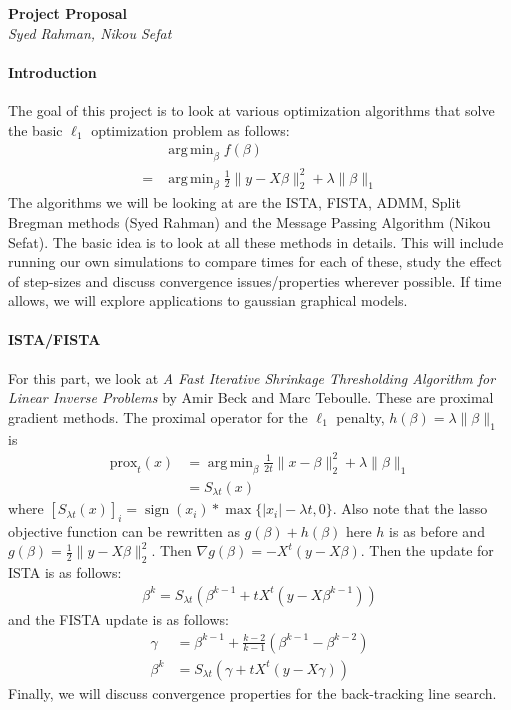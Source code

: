 \documentclass[12pt, leqno]{article}
\providecommand{\abs}[1]{\lvert#1\rvert} %
\providecommand{\norm}[1]{\lVert#1\rVert} %
\DeclareMathOperator*{\argmin}{arg\,min}
\DeclareMathOperator*{\sign}{sign}
\begin{document}
\pagestyle{fancy}

\begin{center}
{\large {\bf Project Proposal}} \\
{{\it Syed Rahman, Nikou Sefat}} \\
\end{center}

\paragraph{Introduction} The goal of this project is to look at various
optimization algorithms that solve the basic $\ell_1$ optimization
problem as follows:
\begin{align}
\label{eq:lasso}
& \argmin_{\beta} f(\beta) \\ 
\nonumber 
=& \argmin_{\beta} \frac{1}{2}\norm{y- X \beta}_2^2 + \lambda \norm{\beta}_1
\end{align}
The algorithms we will be looking at are the ISTA, FISTA, ADMM, Split
Bregman methods (Syed Rahman) and the Message Passing Algorithm (Nikou Sefat). The
basic idea is to look at all these methods in details. This will include running our own simulations to compare times
for each of these, study the effect of step-sizes and discuss
convergence issues/properties wherever possible. If time allows, we
will explore applications to gaussian graphical models. 

\paragraph{ISTA/FISTA} For this part, we look at {\it A Fast
  Iterative Shrinkage Thresholding Algorithm
for Linear Inverse Problems} by Amir Beck and Marc Teboulle. These are
proximal gradient methods. The proximal operator for the $\ell_1$
penalty, $h(\beta) = \lambda \norm{\beta}_1$ is 
\begin{align*}
\text{prox}_t(x) &= \argmin_{\beta} \frac{1}{2t} \norm{x-\beta}_2^2 +
  \lambda \norm{\beta}_1 \\
 &= S_{\lambda t} (x)
\end{align*}
where $[S_{\lambda t} (x)]_i = \sign (x_i)* \max\{ \abs{x_i} - \lambda
t, 0 \}$.
Also note that the lasso objective function can be rewritten as
$g(\beta) + h(\beta)$ here $h$ is as before and $g(\beta) =
\frac{1}{2}\norm{y- X \beta}_2^2$. Then  $\nabla g(\beta) = -X^t (y -
X \beta)$. Then the update for ISTA is as follows:
\begin{align*}
\beta^{k} = S_{\lambda t} (\beta^{k-1} + t X^t (y -
X \beta^{k-1})) 
\end{align*}
and the FISTA update is as follows:
\begin{align*}
\gamma &= \beta^{k-1} + \frac{k-2}{k-1} (\beta^{k-1} - \beta^{k-2}) \\
\beta^{k} &= S_{\lambda t} (\gamma + t X^t (y -
X \gamma)) 
\end{align*}
Finally, we will discuss convergence properties for the back-tracking
line search.
\end{document}
